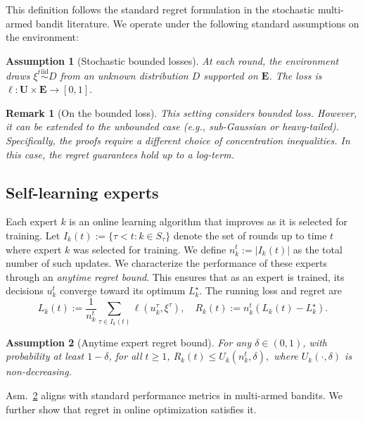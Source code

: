 \documentclass[a4paper,14pt]{extarticle}
\theoremstyle{plain}
\newtheorem{assumption}{Assumption}
\newtheorem{remark}{Remark}
\begin{document}
This definition follows the standard regret formulation in the stochastic multi-armed bandit literature. We operate under the following standard assumptions on the environment:
\begin{assumption}[Stochastic bounded losses]
\label{assumption:stochastic_losses}
At each round, the environment draws $\xi^t \overset{\mathrm{iid}}{\sim} D$ from an unknown distribution $D$ supported on $\mathbf{E}$.
The loss is $\ell:\mathbf{U}\times \mathbf{E}\to [0,1].$
\end{assumption}

\begin{remark}[On the bounded loss]
This setting considers bounded loss. However, it can be extended to the unbounded case (e.g., sub-Gaussian or heavy-tailed). Specifically, the proofs require a different choice of concentration inequalities. In this case, the regret guarantees hold up to a log-term.
\end{remark}




\subsection{Self-learning experts}
\label{sec:arm-dynamics}
Each expert $k$ is an online learning algorithm that improves as it is selected for training. Let $I_k(t) := \{\tau < t : k \in S_\tau\}$ denote the set of rounds up to time $t$ where expert $k$ was selected for training. We define $n_k^t := |I_k(t)|$ as the total number of such updates.
We characterize the performance of these experts through an \textit{anytime regret bound}. This ensures that as an expert is trained, its decisions $u_k^t$ converge toward its optimum $L_k^\star$. The running loss and regret are
\begin{equation}
\label{def:experts_running_loss}
L_{k}(t) := \frac{1}{n^t_k} \sum_{\tau \in I_{k}(t)} \ell(u_k^\tau,\xi^\tau),
\quad
R_k(t) := n^t_k \left( L_{k}(t) - L_k^\star\right).
\end{equation}
\begin{assumption}[Anytime expert regret bound]
\label{assumption:expert_regret}
For any $\delta\in(0,1)$, with probability at least $1-\delta$, for all $t\ge 1$, $R_k(t) \le U_k(n_k^t,\delta),$
where $U_k(\cdot,\delta)$ is non-decreasing.
\end{assumption}
Asm.~\ref{assumption:expert_regret} aligns with standard performance metrics in multi-armed bandits. We further show that regret in online optimization satisfies it.
\end{document}
